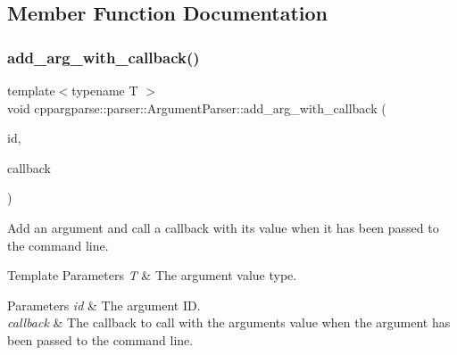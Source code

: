 \subsection{Member Function Documentation}
\mbox{\label{classcppargparse_1_1parser_1_1ArgumentParser_aad667a38fb847cd48b15f66cb99c1818}} 
\subsubsection{\texorpdfstring{add\+\_\+arg\+\_\+with\+\_\+callback()}{add\_arg\_with\_callback()}\hspace{0.1cm}{\footnotesize\ttfamily [1/3]}}
{\footnotesize\ttfamily template$<$typename T $>$ \\
void cppargparse\+::parser\+::\+Argument\+Parser\+::add\+\_\+arg\+\_\+with\+\_\+callback (\begin{DoxyParamCaption}\item[{const std\+::string \&}]{id,  }\item[{const std\+::function$<$ void(const \hyperlink{classcppargparse_1_1parser_1_1ArgumentParser}{Argument\+Parser} \&, const T \&)$>$ \&}]{callback }\end{DoxyParamCaption})\hspace{0.3cm}{\ttfamily [inline]}}



Add an argument and call a callback with its value when it has been passed to the command line. 


\begin{DoxyTemplParams}{Template Parameters}
{\em T} & The argument value type.\\
\hline
\end{DoxyTemplParams}

\begin{DoxyParams}{Parameters}
{\em id} & The argument ID. \\
\hline
{\em callback} & The callback to call with the argument\textquotesingle{}s value when the argument has been passed to the command line. \\
\hline
\end{DoxyParams}
\mbox{\label{classcppargparse_1_1parser_1_1ArgumentParser_a303a12481a661f3d38c66718d6e593a7}} 
